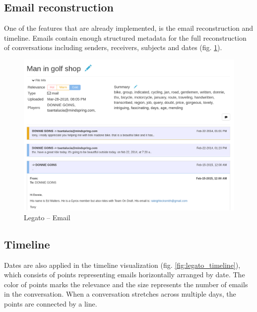 \documentclass[
  digital, %
  notable,   %
  nolof,     %
  nolot,     %
]{fithesis3}
\begin{document}
\subsection*{Email reconstruction}
One of the features that are already implemented, is the email reconstruction and timeline.
Emails contain enough structured metadata for the full reconstruction of conversations including senders, receivers, subjects and dates (fig. \ref{fig:legato_email}).

\begin{figure}[h]
\caption{Legato -- Email}
\label{fig:legato_email}
\includegraphics[width=\textwidth]{img/Legato-Email}
\end{figure}

\subsection*{Timeline}
Dates are also applied in the timeline visualization (fig. \ref{fig:legato_timeline}), which consists of points representing emails horizontally arranged by date.
The color of points marks the relevance and the size represents the number of emails in the conversation.
When a conversation stretches across multiple days, the points are connected by a line.
\end{document}
